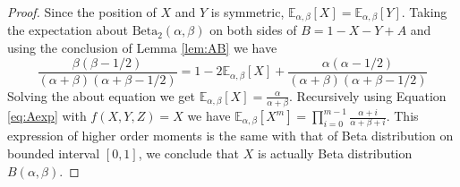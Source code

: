 \documentclass[mathpazo]{cmr}
\def\E{\mathbb{E}}
\def\Beta{\textrm{Beta}}
\begin{document}
\begin{proof}
	Since the position of $X$ and $Y$ is symmetric,
	$\E_{\alpha, \beta}[X]=\E_{\alpha, \beta}[Y]$.
	Taking the expectation about $\Beta_2(\alpha, \beta)$
	on both sides of $B=1-X-Y+A$ and using the
	conclusion of Lemma \ref{lem:AB} we have
	\begin{equation*}
	\frac{\beta(\beta-1/2)}{(\alpha+\beta)(\alpha+\beta-1/2)}
	= 1 - 2\E_{\alpha, \beta}[X] +
	\frac{\alpha(\alpha-1/2)}{(\alpha+\beta)(\alpha+\beta-1/2)}
	\end{equation*}
	Solving the about equation we get
	$\E_{\alpha, \beta}[X]=\frac{\alpha}{\alpha + \beta}$.
	Recursively using Equation \eqref{eq:Aexp} with $f(X,Y,Z)=X$
	we have $\E_{\alpha, \beta}[X^m] =
	\prod_{i=0}^{m-1}\frac{\alpha+i}{\alpha+\beta+i}$.
	This expression of higher order moments
	is the same with that of Beta distribution on bounded interval $[0,1]$, we
	conclude that $X$ is actually Beta distribution $B(\alpha,
	\beta)$.
\end{proof}
\end{document}
